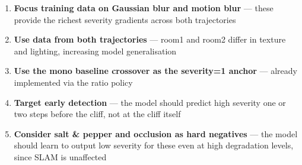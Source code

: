 \documentclass[11pt, a4paper]{article}
\begin{document}
\begin{enumerate}
    \item \textbf{Focus training data on Gaussian blur and motion blur} ---
          these provide the richest severity gradients across both trajectories
    \item \textbf{Use data from both trajectories} ---
          room1 and room2 differ in texture and lighting, increasing model generalisation
    \item \textbf{Use the mono baseline crossover as the severity=1 anchor} ---
          already implemented via the ratio policy
    \item \textbf{Target early detection} --- the model should predict high severity
          one or two steps before the cliff, not at the cliff itself
    \item \textbf{Consider salt \& pepper and occlusion as hard negatives} ---
          the model should learn to output low severity for these even at
          high degradation levels, since SLAM is unaffected
\end{enumerate}
\end{document}
